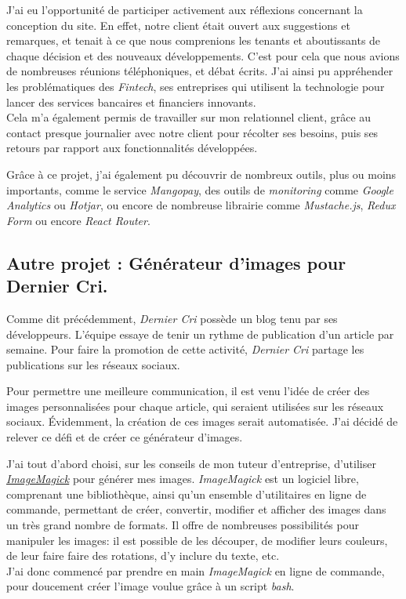 \documentclass[12pt,a4paper]{article}
\begin{document}
  \bigskip

  J'ai eu l'opportunité de participer activement aux réflexions concernant
  la conception du site. En effet, notre client était ouvert aux
  suggestions et remarques, et tenait à ce que nous comprenions les
  tenants et aboutissants de chaque décision et des nouveaux
  développements. C'est pour cela que nous avions de nombreuses réunions
  téléphoniques, et débat écrits. J'ai ainsi pu appréhender les
  problématiques des \emph{Fintech}, ses entreprises qui utilisent la
  technologie pour lancer des services bancaires et financiers
  innovants.\\
  Cela m'a également permis de travailler sur mon relationnel client,
  grâce au contact presque journalier avec notre client pour récolter ses
  besoins, puis ses retours par rapport aux fonctionnalités développées.

  \bigskip

  Grâce à ce projet, j'ai également pu découvrir de nombreux outils, plus
  ou moins importants, comme le service \emph{Mangopay}, des outils de
  \emph{monitoring} comme \emph{Google Analytics} ou \emph{Hotjar}, ou
  encore de nombreuse librairie comme \emph{Mustache.js}, \emph{Redux
  Form} ou encore \emph{React Router}.

  \bigskip

  \subsection{Autre projet : Générateur d'images pour Dernier
  Cri.}\label{autre-projet-guxe9nuxe9rateur-dimages-pour-dernier-cri.}

  \bigskip

  Comme dit précédemment, \emph{Dernier Cri} possède un blog tenu par ses
  développeurs. L'équipe essaye de tenir un rythme de publication d'un
  article par semaine. Pour faire la promotion de cette activité,
  \emph{Dernier Cri} partage les publications sur les réseaux sociaux.

  \bigskip

  Pour permettre une meilleure communication, il est venu l'idée de créer
  des images personnalisées pour chaque article, qui seraient utilisées
  sur les réseaux sociaux. Évidemment, la création de ces images serait
  automatisée. J'ai décidé de relever ce défi et de créer ce générateur
  d'images.

  \bigskip

  J'ai tout d'abord choisi, sur les conseils de mon tuteur d'entreprise,
  d'utiliser
  \href{https://www.imagemagick.org/script/index.php}{\emph{ImageMagick}}
  pour générer mes images. \emph{ImageMagick} est un logiciel libre,
  comprenant une bibliothèque, ainsi qu'un ensemble d'utilitaires en ligne
  de commande, permettant de créer, convertir, modifier et afficher des
  images dans un très grand nombre de formats. Il offre de nombreuses
  possibilités pour manipuler les images: il est possible de les découper,
  de modifier leurs couleurs, de leur faire faire des rotations, d'y
  inclure du texte, etc.\\
  J'ai donc commencé par prendre en main \emph{ImageMagick} en ligne de
  commande, pour doucement créer l'image voulue grâce à un script
  \emph{bash}.
\end{document}
